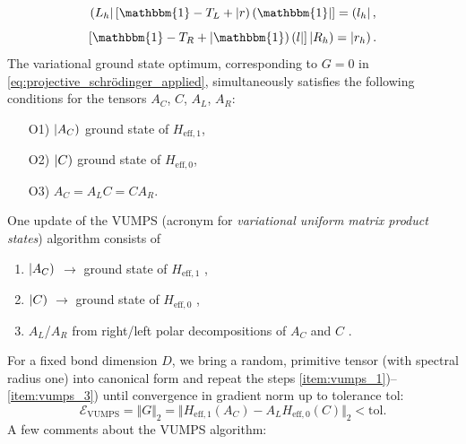 \begin{equation} \label{eq:Lh_LE}
	\tbra{L_h} \left[ \mathbbm{1} - T_L + \tket{r} \tbra{\mathbbm{1}} \right] = \tbra{l_h},
\end{equation}
\begin{equation} \label{eq:Rh_LE}
	\left[ \mathbbm{1} - T_R + \tket{\mathbbm{1}} \tbra{l} \right] \tket{R_h} = \tket{r_h}.
\end{equation}
The variational ground state optimum, corresponding to $G = 0$ in \eqref{eq:projective_schrödinger_applied}, simultaneously satisfies the following conditions for the tensors $A_C$, $C$, $A_L$, $A_R$:
\begin{enumerate}[leftmargin=4em]
	\item[O1)] $\left| A_C \right)$ ground state of $H_{\mathrm{eff}, 1}$,
	\item[O2)] $\left| C \right)$ ground state of $H_{\mathrm{eff}, 0}$,
	\item[O3)] $A_C = A_L C = C A_R$.
\end{enumerate}
One update of the VUMPS (acronym for \textit{variational uniform matrix product states}) algorithm consists of
\begin{enumerate}[label=A\arabic*), ref=A\arabic*, leftmargin=4em]
	\item $\left| A_C \right)$ $\rightarrow$ ground state of $H_{\mathrm{eff}, 1}$ \label{item:vumps_1},
	\item $\left| C \right)$ $\rightarrow$ ground state of $H_{\mathrm{eff}, 0}$ \label{item:vumps_2}, 
	\item $A_L$/$A_R$ from right/left polar decompositions of $A_C$ and $C$ \label{item:vumps_3}. 
\end{enumerate}
For a fixed bond dimension $D$, we bring a random, primitive tensor (with spectral radius one) into canonical form and repeat the steps \ref{item:vumps_1})--\ref{item:vumps_3}) until convergence in gradient norm up to tolerance tol:
\begin{equation} \label{eq:gradient_norm}
	\mathcal{E}_{\mathrm{VUMPS}} = \Vert G \Vert_2 = \Vert H_{\mathrm{eff},1}(A_C) - A_L H_{\mathrm{eff},0}(C) \Vert_2 < \mathrm{tol}.
\end{equation}
A few comments about the VUMPS algorithm: 
